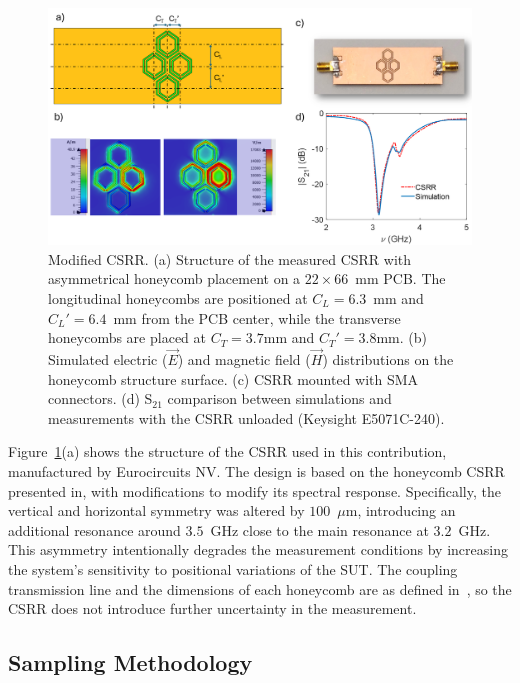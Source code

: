 \documentclass[journal,twoside,web]{ieeecolor}
\begin{document}
\begin{figure}[!t]
	\centering
	\includegraphics [trim = 0mm 0mm 0mm 0mm, clip, width=1\columnwidth]{figures/fig2.png}
	\caption{Modified CSRR. (a) Structure of the measured CSRR with asymmetrical honeycomb placement on a $22\times66$~mm PCB. The longitudinal honeycombs are positioned at $C_{L}=6.3$~mm and $C_{L}'=6.4$~mm from the PCB center, while the transverse honeycombs are placed at $C_{T}=3.7$mm and $C_{T}'=3.8$mm. (b) Simulated electric ($\vec{E}$) and magnetic field ($\vec{H}$) distributions on the honeycomb structure surface. (c) CSRR mounted with SMA connectors. (d) S$_{21}$ comparison between simulations and measurements with the CSRR unloaded (Keysight E5071C-240).}
	\label{fig:csrr}
	\vspace{-0.3cm}
\end{figure}

Figure~\ref{fig:csrr}(a) shows the structure of the CSRR used in this contribution, manufactured by Eurocircuits NV. The design is based on the honeycomb CSRR presented in\cite{Omer2020}, with modifications to modify its spectral response. Specifically, the vertical and horizontal symmetry was altered by $100$~$\mu$m, introducing an additional resonance around $3.5$~GHz close to the main resonance at $3.2$~GHz. This asymmetry intentionally degrades the measurement conditions by increasing the system's sensitivity to positional variations of the SUT. The coupling transmission line and the dimensions of each honeycomb are as defined in~\cite{Omer2020}, so the CSRR does not introduce further uncertainty in the measurement.

\subsection{Sampling Methodology}
\label{ssec:samplingMethod}
\end{document}
